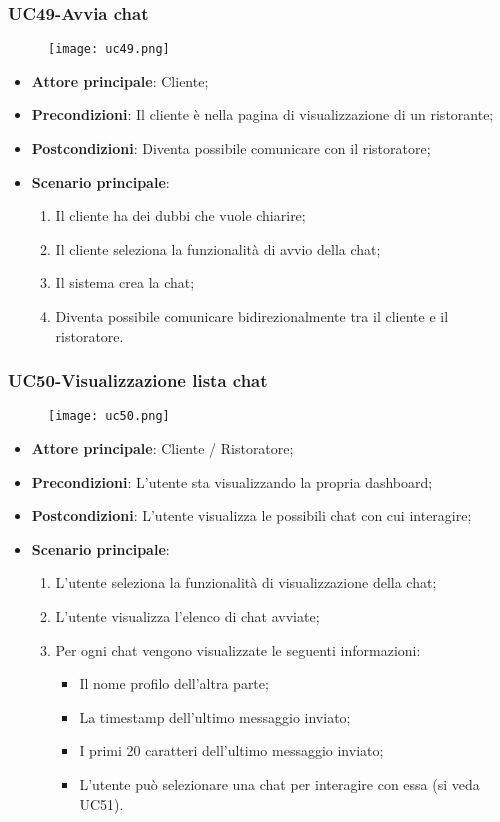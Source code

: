 \nonstopmode
\pagebreak
\subsubsection{UC49-Avvia chat}
\begin{figure}[h] \texttt{[image: uc49.png]} \end{figure}

\begin{itemize}
\item \textbf{Attore principale}: Cliente;
\item \textbf{Precondizioni}: Il cliente è nella pagina di visualizzazione di un ristorante;
\item \textbf{Postcondizioni}: Diventa possibile comunicare con il ristoratore;
\item \textbf{Scenario principale}:
\begin{enumerate}
\item Il cliente ha dei dubbi che vuole chiarire;
\item Il cliente seleziona la funzionalità di avvio della chat;
\item Il sistema crea la chat;
\item Diventa possibile comunicare bidirezionalmente tra il cliente e il ristoratore.
\end{enumerate}
\end{itemize}

\subsubsection{UC50-Visualizzazione lista chat}
\begin{figure}[h] \texttt{[image: uc50.png]} \end{figure}

\begin{itemize}
\item \textbf{Attore principale}: Cliente / Ristoratore;
\item \textbf{Precondizioni}: L'utente sta visualizzando la propria dashboard;
\item \textbf{Postcondizioni}: L'utente visualizza le possibili chat con cui interagire;
\item \textbf{Scenario principale}:
\begin{enumerate}
\item L'utente seleziona la funzionalità di visualizzazione della chat;
\item L'utente visualizza l'elenco di chat avviate;
\item Per ogni chat vengono visualizzate le seguenti informazioni:
\begin{itemize}
\item Il nome profilo dell'altra parte;
\item La timestamp dell'ultimo messaggio inviato;
\item I primi 20 caratteri dell'ultimo messaggio inviato;
\item L'utente può selezionare una chat per interagire con essa (si veda UC51).
\end{itemize}
\end{enumerate}
\end{itemize}

